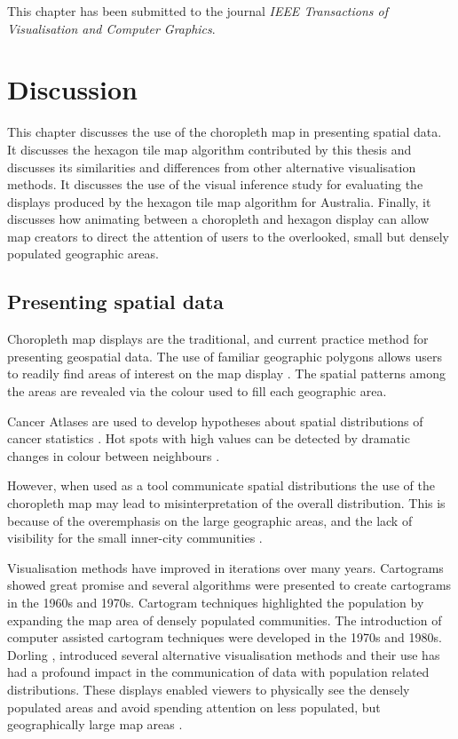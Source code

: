 \documentclass{monashthesis}
\begin{document}
This chapter has been submitted to the journal \emph{IEEE Transactions of Visualisation and Computer Graphics}.





\hypertarget{ch:discussion}{%
\chapter{Discussion}\label{ch:discussion}}

This chapter discusses the use of the choropleth map in presenting spatial data.
It discusses the hexagon tile map algorithm contributed by this thesis and discusses its similarities and differences from other alternative visualisation methods.
It discusses the use of the visual inference study for evaluating the displays produced by the hexagon tile map algorithm for Australia. Finally, it discusses how animating between a choropleth and hexagon display can allow map creators to direct the attention of users to the overlooked, small but densely populated geographic areas.

\hypertarget{presenting-spatial-data}{%
\section{Presenting spatial data}\label{presenting-spatial-data}}

Choropleth map displays are the traditional, and current practice method for presenting geospatial data. The use of familiar geographic polygons allows users to readily find areas of interest on the map display \autocite{EI}. The spatial patterns among the areas are revealed via the colour used to fill each geographic area.

Cancer Atlases are used to develop hypotheses about spatial distributions of cancer statistics \autocite{CPISACA}. Hot spots with high values can be detected by dramatic changes in colour between neighbours \autocite{MACM}.

However, when used as a tool communicate spatial distributions the use of the choropleth map may lead to misinterpretation of the overall distribution. This is because of the overemphasis on the large geographic areas, and the lack of visibility for the small inner-city communities \autocite{ACTUC}.

Visualisation methods have improved in iterations over many years. Cartograms \autocite{ACCAC} showed great promise and several algorithms were presented to create cartograms in the 1960s and 1970s. Cartogram techniques highlighted the population by expanding the map area of densely populated communities.
The introduction of computer assisted cartogram techniques were developed in the 1970s and 1980s. Dorling \autocite{TVSSS}, \autocite{ACTUC} introduced several alternative visualisation methods and their use has had a profound impact in the communication of data with population related distributions. These displays enabled viewers to physically see the densely populated areas and avoid spending attention on less populated, but geographically large map areas \autocite{CTTMB}.
\end{document}
